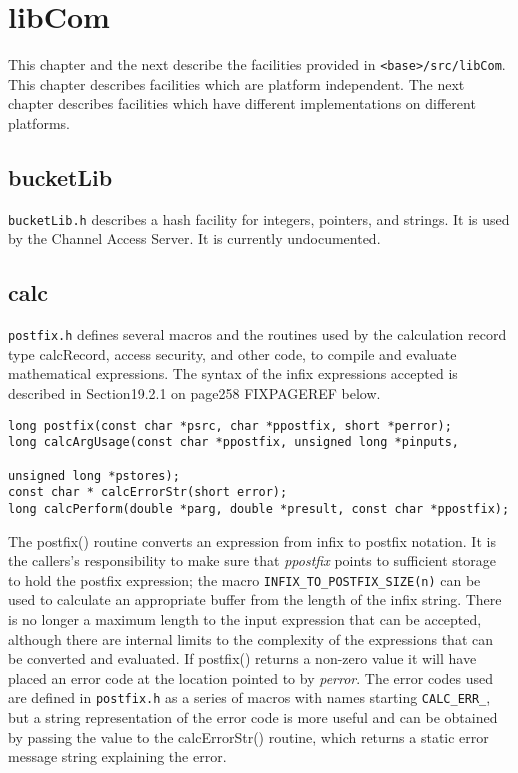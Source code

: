 \chapter{libCom}

This chapter and the next describe the facilities provided in \verb|<base>/src/libCom|. This chapter describes facilities 
which are platform independent. The next chapter describes facilities which have different implementations on different 
platforms.

\section{bucketLib}

\verb|bucketLib.h| describes a hash facility for integers, pointers, and strings. It is used by the Channel Access Server. It is 
currently undocumented.

\section{calc}

\verb|postfix.h| defines several macros and the routines used by the calculation record type calcRecord, access security, and 
other code, to compile and evaluate mathematical expressions. The syntax of the infix expressions accepted is described 
in Section19.2.1 on page258 FIXPAGEREF below.

\begin{verbatim}
long postfix(const char *psrc, char *ppostfix, short *perror);
long calcArgUsage(const char *ppostfix, unsigned long *pinputs, 

unsigned long *pstores);
const char * calcErrorStr(short error);
long calcPerform(double *parg, double *presult, const char *ppostfix);
\end{verbatim}

The postfix() routine converts an expression from infix to postfix notation. It is the callers's responsibility to make sure 
that \emph{ppostfix} points to sufficient storage to hold the postfix expression; the macro \verb|INFIX_TO_POSTFIX_SIZE(n)| can 
be used to calculate an appropriate buffer from the length of the infix string. There is no longer a maximum length to the 
input expression that can be accepted, although there are internal limits to the complexity of the expressions that can be 
converted and evaluated. If postfix() returns a non-zero value it will have placed an error code at the location pointed to 
by \emph{perror}. The error codes used are defined in \verb|postfix.h| as a series of macros with names starting \verb|CALC_ERR_|, but a 
string representation of the error code is more useful and can be obtained by passing the value to the calcErrorStr() 
routine, which returns a static error message string explaining the error.

